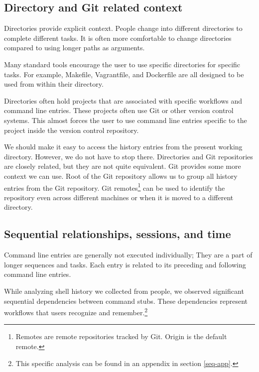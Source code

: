 \subsection{Directory and Git related context}

Directories provide explicit context. People change into different directories to complete different tasks.\cite{greenberg1993computer} It is often more comfortable to change directories compared to using longer paths as arguments. 

Many standard tools encourage the user to use specific directories for specific tasks. 
For example, Makefile, Vagrantfile, and Dockerfile are all designed to be used from within their directory\cite{man-make}\cite{docs-vagrantfile}\cite{docs-dockerfile}. 

Directories often hold projects that are associated with specific workflows and command line entries. 
These projects often use Git or other version control systems. This almost forces the user to use command line entries specific to the project inside the version control repository. 

We should make it easy to access the history entries from the present working directory.
However, we do not have to stop there. Directories and Git repositories are closely related, but they are not quite equivalent. Git provides some more context we can use. 
Root of the Git repository allows us to group all history entries from the Git repository.
Git remotes\footnote{Remotes are remote repositories tracked by Git. Origin is the default remote.} can be used to identify the repository even across different machines or when it is moved to a different directory. 




\subsection{Sequential relationships, sessions, and time}

Command line entries are generally not executed individually; They are a part of longer sequences and tasks.\cite{greenberg1993computer} Each entry is related to its preceding and following command line entries. 

While analyzing shell history we collected from people, we observed significant sequential dependencies between command stubs. These dependencies represent workflows that users recognize and remember.\footnote{This specific analysis can be found in an appendix in section \ref{seq-app}.}

